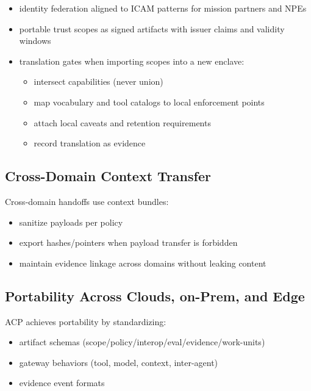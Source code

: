 \documentclass[11pt]{article}
\begin{document}
\begin{itemize}
\tightlist
\item
  identity federation aligned to ICAM patterns for mission partners and
  NPEs
\item
  portable trust scopes as signed artifacts with issuer claims and
  validity windows
\item
  translation gates when importing scopes into a new enclave:

  \begin{itemize}
  \tightlist
  \item
    intersect capabilities (never union)
  \item
    map vocabulary and tool catalogs to local enforcement points
  \item
    attach local caveats and retention requirements
  \item
    record translation as evidence
  \end{itemize}
\end{itemize}

\hypertarget{cross-domain-context-transfer}{%
\subsection{Cross-Domain Context Transfer}\label{cross-domain-context-transfer}}

Cross-domain handoffs use context bundles:

\begin{itemize}
\tightlist
\item
  sanitize payloads per policy
\item
  export hashes/pointers when payload transfer is forbidden
\item
  maintain evidence linkage across domains without leaking content
\end{itemize}

\hypertarget{portability-across-clouds-on-prem-and-edge}{%
\subsection{Portability Across Clouds, on-Prem, and Edge}\label{portability-across-clouds-on-prem-and-edge}}

ACP achieves portability by standardizing:

\begin{itemize}
\tightlist
\item
  artifact schemas (scope/policy/interop/eval/evidence/work-units)
\item
  gateway behaviors (tool, model, context, inter-agent)
\item
  evidence event formats
\end{itemize}
\end{document}
